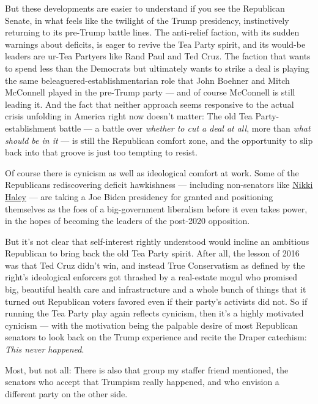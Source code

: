 But these developments are easier to understand if you see the
Republican Senate, in what feels like the twilight of the Trump
presidency, instinctively returning to its pre-Trump battle lines. The
anti-relief faction, with its sudden warnings about deficits, is eager
to revive the Tea Party spirit, and its would-be leaders are ur-Tea
Partyers like Rand Paul and Ted Cruz. The faction that wants to spend
less than the Democrats but ultimately wants to strike a deal is playing
the same beleaguered-establishmentarian role that John Boehner and Mitch
McConnell played in the pre-Trump party --- and of course McConnell is
still leading it. And the fact that neither approach seems responsive to
the actual crisis unfolding in America right now doesn't matter: The old
Tea Party-establishment battle --- a battle over \emph{whether to cut a
deal at all}, more than \emph{what should be in it} --- is still the
Republican comfort zone, and the opportunity to slip back into that
groove is just too tempting to resist.

Of course there is cynicism as well as ideological comfort at work. Some
of the Republicans rediscovering deficit hawkishness --- including
non-senators like
\href{https://medium.com/@nikkihaley/a-day-of-reckoning-is-coming-with-the-national-debt-c30296bffe50}{Nikki
Haley} --- are taking a Joe Biden presidency for granted and positioning
themselves as the foes of a big-government liberalism before it even
takes power, in the hopes of becoming the leaders of the post-2020
opposition.

But it's not clear that self-interest rightly understood would incline
an ambitious Republican to bring back the old Tea Party spirit. After
all, the lesson of 2016 was that Ted Cruz didn't win, and instead True
Conservatism as defined by the right's ideological enforcers got
thrashed by a real-estate mogul who promised big, beautiful health care
and infrastructure and a whole bunch of things that it turned out
Republican voters favored even if their party's activists did not. So if
running the Tea Party play again reflects cynicism, then it's a highly
motivated cynicism --- with the motivation being the palpable desire of
most Republican senators to look back on the Trump experience and recite
the Draper catechism: \emph{This never happened}.

Most, but not all: There is also that group my staffer friend mentioned,
the senators who accept that Trumpism really happened, and who envision
a different party on the other side.

